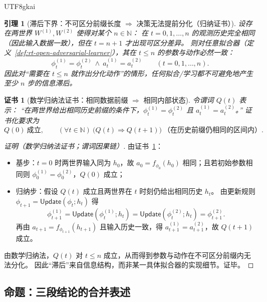 \documentclass[12pt]{article}
\newtheorem{lemma}{引理}[section]
\newtheorem{Certificate}{证书}[section]
\newcommand{\NN}{\mathbb{N}}
\begin{document}
\begin{CJK*}{UTF8}{gkai}
\begin{lemma}[滞后下界：不可区分前缀长度 $\Rightarrow$ 决策无法提前分化（归纳证书）]
\label{lem:rt-open-adversarial-lag-lower-bound}
设存在两世界 $W^{(1)},W^{(2)}$ 使得对某个 $n\in\NN$：
在 $t=0,1,\dots,n$ 的观测历史完全相同（因此输入数据一致），但在 $t=n+1$ 才出现可区分差异。
则对任意拟合器（定义~\ref{def:rt-open-adversarial-learner}），其在 $t\le n$ 的参数与动作必然一致：
\[
  \phi_t^{(1)}=\phi_t^{(2)}\ \wedge\ a_t^{(1)}=a_t^{(2)}\qquad (t=0,1,\dots,n).
\]
因此对“需要在 $t\le n$ 就作出分化动作”的情形，任何拟合/学习都不可避免地产生至少 $n$ 步的信息滞后。
\end{lemma}

\begin{Certificate}[数学归纳法证书：相同数据前缀 $\Rightarrow$ 相同内部状态]
\label{cert:rt-open-adversarial-lag-lower-bound}
令谓词 $Q(t)$ 表示：
“在两世界给出相同历史前缀的条件下，$\phi_t^{(1)}=\phi_t^{(2)}$ 且 $a_t^{(1)}=a_t^{(2)}$。”
证书化要求为
\[
  Q(0)\ \text{成立},\qquad (\forall t\in\NN)\ \bigl(Q(t)\Rightarrow Q(t+1)\bigr)\ \text{（在历史前缀仍相同的区间内）}.
\]
\end{Certificate}

\begin{proof}[证明（数学归纳法证书；谓词因果链）]
由证书~\ref{cert:rt-open-adversarial-lag-lower-bound}：
\begin{itemize}
  \item 基步：$t=0$ 时两世界输入同为 $h_0$，故 $a_0=f_{\phi_0}(h_0)$ 相同；且若初始参数相同则 $\phi_0^{(1)}=\phi_0^{(2)}$，$Q(0)$ 成立；
  \item 归纳步：假设 $Q(t)$ 成立且两世界在 $t$ 时刻仍给出相同历史 $h_t$。
  由更新规则 $\phi_{t+1}=\mathsf{Update}(\phi_t;h_t)$ 得
  \[
    \phi_{t+1}^{(1)}=\mathsf{Update}(\phi_t^{(1)};h_t)=\mathsf{Update}(\phi_t^{(2)};h_t)=\phi_{t+1}^{(2)}.
  \]
  再由 $a_{t+1}=f_{\phi_{t+1}}(h_{t+1})$ 且输入历史一致，得 $a_{t+1}^{(1)}=a_{t+1}^{(2)}$，故 $Q(t+1)$ 成立。
\end{itemize}
由数学归纳法，$Q(t)$ 对 $t\le n$ 成立，从而得到参数与动作在不可区分前缀内无法分化。
因此“滞后”来自信息结构，而非某一具体拟合器的实现细节。证毕。
\end{proof}

\subsection{命题：三段结论的合并表述}
\label{sec:rt-open-adversarial-combined}


\end{CJK*}
\end{document}
